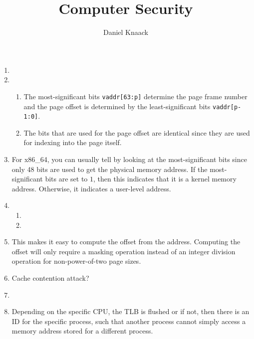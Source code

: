 \documentclass[sheet=1, prefix]{dexercise}
\title{Computer Security}
\author{Daniel Knaack}
\begin{document}

\begin{enumerate}
  \item

  \item
    \begin{enumerate}
      \item
        The most-significant bits \texttt{vaddr[63:p]} determine the page frame number
        and the page offset is determined by the least-significant bits \texttt{vaddr[p-1:0]}.
      \item
        The bits that are used for the page offset are identical since they are
        used for indexing into the page itself.
    \end{enumerate}
  \item
    For x86\_64, you can usually tell by looking at the most-significant bits
    since only 48 bits are used to get the physical memory address.
    If the most-significant bits are set to $1$, then this indicates that it is a kernel memory address.
    Otherwise, it indicates a user-level address.
  \item
    \begin{enumerate}
      \item
      \item
    \end{enumerate}
  \item
    This makes it easy to compute the offset from the address.
    Computing the offset will only require a masking operation instead of an
    integer division operation for non-power-of-two page sizes.
  \item
    Cache contention attack?
  \item

  \item
    Depending on the specific CPU, the TLB is flushed or if not, then there is an ID for the specific process,
    such that another process cannot simply access a memory address stored for a different process.
\end{enumerate}

\end{document}
